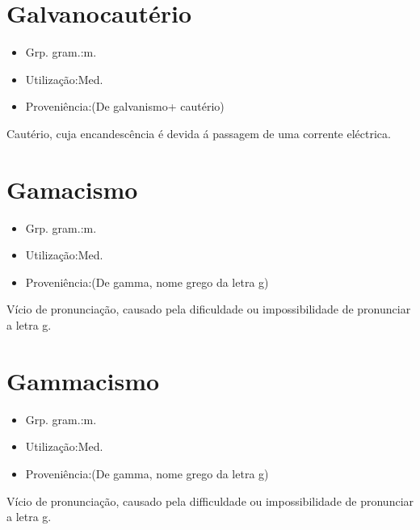 \section{Galvanocautério}
\begin{itemize}
\item {Grp. gram.:m.}
\end{itemize}
\begin{itemize}
\item {Utilização:Med.}
\end{itemize}
\begin{itemize}
\item {Proveniência:(De \textunderscore galvanismo\textunderscore  + \textunderscore cautério\textunderscore )}
\end{itemize}
Cautério, cuja encandescência é devida á passagem de uma corrente eléctrica.
\section{Gamacismo}
\begin{itemize}
\item {Grp. gram.:m.}
\end{itemize}
\begin{itemize}
\item {Utilização:Med.}
\end{itemize}
\begin{itemize}
\item {Proveniência:(De \textunderscore gamma\textunderscore , nome grego da letra \textunderscore g\textunderscore )}
\end{itemize}
Vício de pronunciação, causado pela dificuldade ou impossibilidade de pronunciar a letra \textunderscore g\textunderscore .
\section{Gammacismo}
\begin{itemize}
\item {Grp. gram.:m.}
\end{itemize}
\begin{itemize}
\item {Utilização:Med.}
\end{itemize}
\begin{itemize}
\item {Proveniência:(De \textunderscore gamma\textunderscore , nome grego da letra \textunderscore g\textunderscore )}
\end{itemize}
Vício de pronunciação, causado pela difficuldade ou impossibilidade de pronunciar a letra \textunderscore g\textunderscore .
